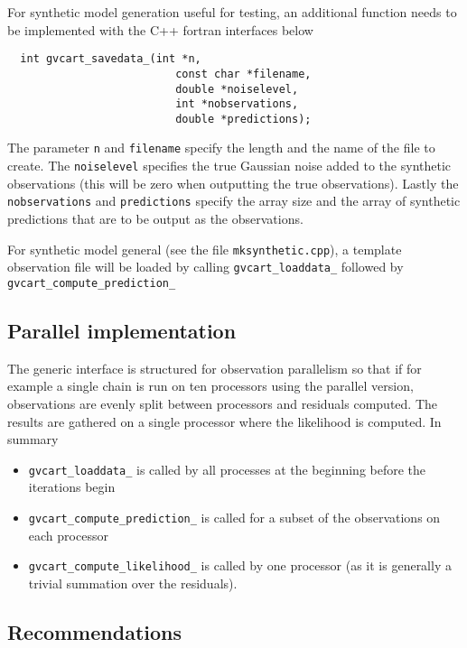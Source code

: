 \documentclass[a4paper,12pt]{article}
\begin{document}
For synthetic model generation useful for testing, an additional function needs to be
implemented with the C++ fortran interfaces below

\begin{verbatim}
  int gvcart_savedata_(int *n,
                          const char *filename,
                          double *noiselevel,
                          int *nobservations,
                          double *predictions);
\end{verbatim}

The parameter {\tt n} and {\tt filename} specify the length and the name
of the file to create. The {\tt noiselevel} specifies the true Gaussian
noise added to the synthetic observations (this will be zero when
outputting the true observations). Lastly the {\tt nobservations} and
{\tt predictions} specify the array size and the array of synthetic
predictions that are to be output as the observations.

For synthetic model general (see the file {\tt mksynthetic.cpp}), a
template observation file will be loaded by calling {\tt gvcart\_loaddata\_}
followed by {\tt gvcart\_compute\_prediction\_} 

\subsection{Parallel implementation}

The generic interface is structured for observation parallelism so that if for example
a single chain is run on ten processors using the parallel version, observations are
evenly split between processors and residuals computed. The results are gathered on
a single processor where the likelihood is computed. In summary

\begin{itemize}
\item {\tt gvcart\_loaddata\_} is called by all processes at the beginning before
  the iterations begin
\item {\tt gvcart\_compute\_prediction\_} is called for a subset of the observations
  on each processor
\item {\tt gvcart\_compute\_likelihood\_} is called by one processor (as it is
  generally a trivial summation over the residuals).
\end{itemize}

\subsection{Recommendations}
\end{document}
